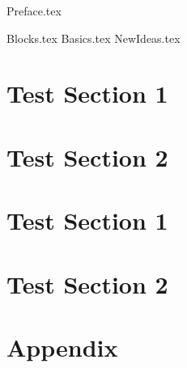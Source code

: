 \documentclass[
    twoside,
]{styles/mori-book}%
\begin{document}
    \maketitlepage

    \frontmatter
    \pagestyle{front}
    {Preface.tex}

    \maketocpage

    \mainmatter

    \pagestyle{main}

    {Blocks.tex}
    {Basics.tex}
    {NewIdeas.tex}

    \setcounter{chapter}{8}
    
     \label{chap:TC1}
    
    \section{Test Section 1} \label{sec:9TS1}
    \lipsum[1-5]
    
    \setcounter{section}{9}
    
    \section{Test Section 2}
    
    \lipsum[6-9]
    
    \lipsum[1-2]
    
    \section{Test Section 1}
    
    \setcounter{section}{9}
    
    \section{Test Section 2}

    \setcounter{part}{4}

    \appendix
    \section{Appendix}

    \backmatter


    \lipsum[2-3]
    
\end{document}
